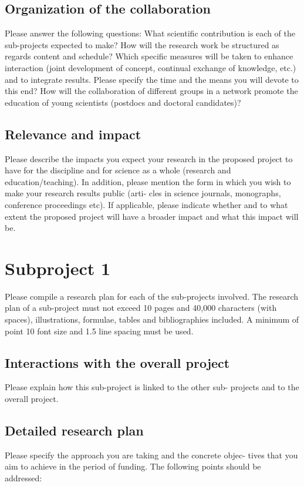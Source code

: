 \subsection{Organization of the collaboration}

Please answer the following questions: What scientific contribution is each
of the sub-projects expected to make? How will the research work be structured
as regards content and schedule? Which specific measures will be taken to enhance
interaction (joint development of concept, continual exchange of knowledge,
etc.) and to integrate results. Please specify the time and the means you will
devote to this end? How will the collaboration of different groups in a network
promote the education of young scientists (postdocs and doctoral candidates)?


\subsection{Relevance and impact}

Please describe the impacts you expect your research in the proposed project
to have for the discipline and for science as a whole (research and education/teaching).
In addition, please mention the form in which you wish to make your research
results public (arti- cles in science journals, monographs, conference proceedings
etc). If applicable, please indicate whether and to what extent the proposed
project will have a broader impact and what this impact will be.


\section{Subproject 1}

Please compile a research plan for each of the sub-projects involved. The research
plan of a sub-project must not exceed 10 pages and 40,000 characters (with spaces),
illustrations, formulae, tables and bibliographies included. A minimum of point
10 font size and 1.5 line spacing must be used.


\subsection{Interactions with the overall project}

Please explain how this sub-project is linked to the other sub- projects and
to the overall project.


\subsection{Detailed research plan}

Please specify the approach you are taking and the concrete objec- tives that
you aim to achieve in the period of funding. The following points should be
addressed: 